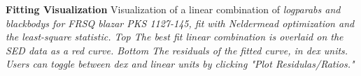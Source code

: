 \textbf{\label{fig:fitting_window} Fitting Visualization} Visualization of a linear combination of \em{logparab}s and \em{blackbody}s for FRSQ blazar PKS 1127-145, fit with Neldermead optimization and the least-square statistic. \em{Top} The best fit linear combination is overlaid on the SED data as a red curve. \em{Bottom} The residuals of the fitted curve, in dex units. Users can toggle between dex and linear units by clicking "Plot Residulas/Ratios."
